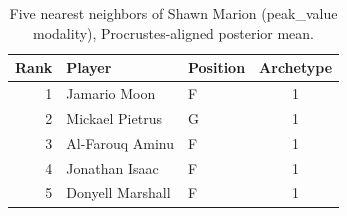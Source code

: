\begin{table}[htbp]
  \centering\small
  \begin{tabular}{rllc}
    \toprule
    Rank & Player & Position & Archetype \\
    \midrule
    1 & Jamario Moon & F & 1 \\
    2 & Mickael Pietrus & G & 1 \\
    3 & Al-Farouq Aminu & F & 1 \\
    4 & Jonathan Isaac & F & 1 \\
    5 & Donyell Marshall & F & 1 \\
    \bottomrule
  \end{tabular}
  \caption{Five nearest neighbors of Shawn Marion (peak_value modality), Procrustes-aligned posterior mean.}
  \label{tab:Shawn_Marion_neighbors_peak_value}
\end{table}

